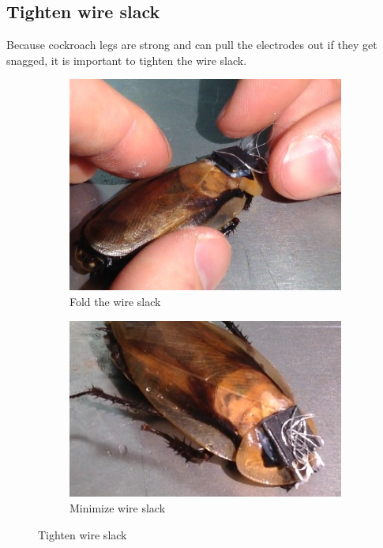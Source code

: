 \subsection{Tighten wire slack}
Because cockroach legs are strong and can pull the electrodes out if they get snagged, it is important to tighten the wire slack. 
\begin{figure}[ht!]
\centering
    \begin{subfigure}{.49\textwidth}
    \centering
    \includegraphics[scale=0.25]{Surgery Photos/nowire.JPG}
    \caption{Fold the wire slack}
    \label{fig:nowire}
    \end{subfigure}
    \begin{subfigure}{.49\textwidth}
    \centering
    \includegraphics[scale=0.4]{Surgery Photos/nowire2.JPG}
    \caption{Minimize wire slack}
    \label{fig:nowire2}
    \end{subfigure}
\caption{Tighten wire slack}
\label{fig:connectorB}
\end{figure}
